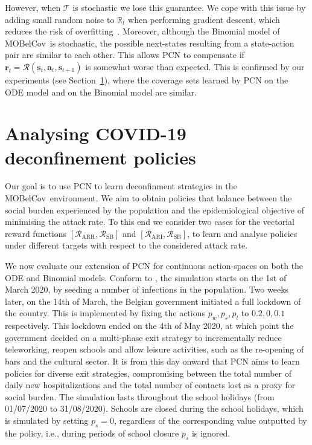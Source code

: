 \documentclass{article}
\renewcommand{\cite}[1]{\citep{#1}}
\newcommand{\mdptransition}{\mathcal{T}}
\newcommand{\mdprewardfn}{\mathcal{R}}
\newcommand{\momdprewardfn}{\bm{\mathcal{R}}}
\newcommand{\mdpstate}{\mathbf{s}}
\newcommand{\mdpreward}{\mathbf{r}}
\newcommand{\mdpaction}{\mathbf{a}}
\newcommand{\momdpname}{MOBelCov}
\begin{document}
However, when $\mdptransition$ is stochastic we lose this guarantee. We cope with this issue by adding small random noise to $\mathbb{R}_t$ when performing gradient descent, which reduces the risk of overfitting~\cite{zur2009noise}. Moreover, although the Binomial model of \momdpname\ is stochastic, the possible next-states resulting from a state-action pair are similar to each other. This allows PCN to compensate if $\mdpreward_t = \momdprewardfn(\mdpstate_t, \mdpaction_t, \mdpstate_{t+1})$ is somewhat worse than expected. This is confirmed by our experiments (see Section~\ref{sec:experiments}), where the coverage sets learned by PCN on the ODE model and on the Binomial model are similar.

\section{Analysing COVID-19 deconfinement policies}
\label{sec:experiments}
Our goal is to use PCN to learn deconfinment strategies in the \momdpname\ environment. We aim to obtain policies that balance between the social burden experienced by the population and the epidemiological objective of minimising the attack rate. To this end we consider two cases for the vectorial reward functions $[\mdprewardfn_\text{ARH}, \mdprewardfn_\text{SB}]$ and $[\mdprewardfn_\text{ARI}, \mdprewardfn_\text{SB}]$, to learn and analyse policies under different targets with respect to the considered attack rate.

We now evaluate our extension of PCN for continuous action-spaces on both the ODE and Binomial models. Conform to \citet{abrams2021modelling}, the simulation starts on the 1st of March 2020, by seeding a number of infections in the population. Two weeks later, on the 14th of March, the Belgian government initiated a full lockdown of the country. This is implemented by fixing the actions $p_w, p_s, p_l$ to $0.2, 0, 0.1$ respectively. This lockdown ended on the 4th of May 2020, at which point the government decided on a multi-phase exit strategy to incrementally reduce teleworking, reopen schools and allow leisure activities, such as the re-opening of bars and the cultural sector. It is from this day onward that PCN aims to learn policies for diverse exit strategies, compromising between the total number of daily new hospitalizations and the total number of contacts lost as a proxy for social burden. The simulation lasts throughout the school holidays (from 01/07/2020 to 31/08/2020). Schools are closed during the school holidays, which is simulated by setting $p_s = 0$, regardless of the corresponding value outputted by the policy, i.e., during periods of school closure $p_s$ is ignored.
\end{document}
